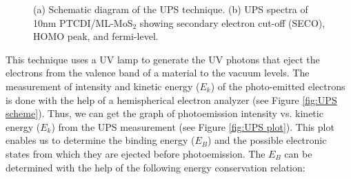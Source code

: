 \documentclass[12pt]{article}
\begin{document}
\begin{figure}[H]
\centering
{}
\caption{(a) Schematic diagram of the UPS technique. (b) UPS spectra of 10nm PTCDI/ML-MoS$_2$ showing secondary electron cut-off (SECO), HOMO peak, and fermi-level.}
\label{fig:UPS method}
\end{figure}


This technique uses a UV lamp to generate the UV photons that eject the electrons from the valence band of a material to the vacuum levels. The measurement of intensity and kinetic energy ($E_k$) of the photo-emitted electrons is done with the help of a hemispherical electron analyzer (see Figure \ref{fig:UPS scheme}). Thus, we can get the graph of photoemission intensity vs. kinetic energy ($E_k$) from the UPS measurement (see Figure \ref{fig:UPS plot}). This plot enables us to determine the binding energy ($E_B$) and the possible electronic states from which they are ejected before photoemission. The $E_B$ can be determined with the help of the following energy conservation relation:
\end{document}
